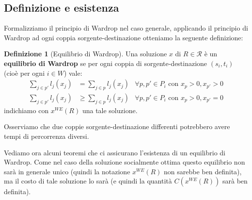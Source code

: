\documentclass[a4paper]{article}
\newcounter{counter1}
\theoremstyle{plain}
\theoremstyle{definition}
\newtheorem{mydef}[counter1]{Definizione}
\theoremstyle{remark}
\newcommand{\pa}[1]{\left(#1\right)}
\begin{document}
\subsection{Definizione e esistenza}
\label{sec:wardrop-definizione}

Formalizziamo il principio di Wardrop nel caso generale, applicando il
principio di Wardrop ad ogni coppia sorgente-destinazione otteniamo la
seguente definizione:
\begin{mydef}[Equilibrio di Wardrop]
  Una soluzione $x$ di $R\in \mathcal{R}$ è un \textbf{equilibrio di
    Wardrop} se per ogni coppia di sorgente-destinazione $(s_i,t_i)$
  (cioè per ogni $i\in W$) vale:
  \begin{align*}
    \sum _{j\in p'} l_j(x_j) &= \sum _{j\in p} l_j(x_j) & \forall
                                                           p,p'\in P_i \text{ con } x_p >0, x_{p'} >0 \\
    \sum _{j\in p'} l_j(x_j) &\ge \sum _{j\in p} l_j(x_j) & \forall
                                                             p,p'\in P_i \text{ con } x_p >0, x_{p'} =0 
  \end{align*}
  indichiamo con $x^{WE}(R)$ una tale soluzione.
\end{mydef}

Osserviamo che due coppie sorgente-destinazione differenti potrebbero
avere tempi di percorrenza diversi.

Vediamo ora alcuni teoremi che ci assicurano l'esistenza di un
equilibrio di Wardrop. Come nel caso della soluzione socialmente
ottima questo equilibrio non sarà in generale unico (quindi la
notazione $x^{WE}(R)$ non sarebbe ben definita), ma il costo di tale
soluzione lo sarà (e quindi la quantità $C\pa{x^{WE}\pa{R}}$ sarà ben
definita).
\end{document}

